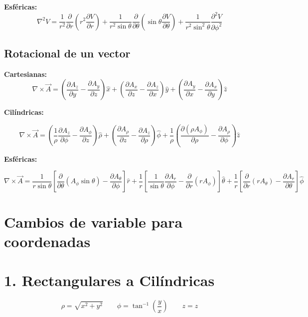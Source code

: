 \documentclass[11pt]{article}
\begin{document}
\textbf{Esféricas:}
\begin{equation}
    \nabla^2 V = \frac{1}{r^2} \frac{\partial}{\partial r} \left( r^2 \frac{\partial V}{\partial r} \right) + \frac{1}{r^2 \sin \theta} \frac{\partial}{\partial \theta} \left( \sin \theta \frac{\partial V}{\partial \theta} \right) + \frac{1}{r^2 \sin^2 \theta} \frac{\partial^2 V}{\partial \phi^2}
\end{equation}

\subsection{Rotacional de un vector}

\textbf{Cartesianas:}
\[
\nabla \times \vec{A} =
\left( \frac{\partial A_z}{\partial y} - \frac{\partial A_y}{\partial z} \right) \hat{x}
+ \left( \frac{\partial A_x}{\partial z} - \frac{\partial A_z}{\partial x} \right) \hat{y}
+ \left( \frac{\partial A_y}{\partial x} - \frac{\partial A_x}{\partial y} \right) \hat{z}
\]


\textbf{Cilíndricas:}

\[
\nabla \times \vec{A} =
\left( \frac{1}{\rho} \frac{\partial A_z}{\partial \phi} - \frac{\partial A_\phi}{\partial z} \right) \hat{\rho}
+ \left( \frac{\partial A_\rho}{\partial z} - \frac{\partial A_z}{\partial \rho} \right) \hat{\phi}
+ \frac{1}{\rho} \left( \frac{\partial (\rho A_\phi)}{\partial \rho} - \frac{\partial A_\rho}{\partial \phi} \right) \hat{z}
\]



\textbf{Esféricas:}

\[
\nabla \times \vec{A} =
\frac{1}{r \sin\theta}
\left[
\frac{\partial}{\partial \theta} (A_\phi \sin\theta) - \frac{\partial A_\theta}{\partial \phi}
\right] \hat{r}
+ \frac{1}{r}
\left[
\frac{1}{\sin\theta} \frac{\partial A_r}{\partial \phi} - \frac{\partial}{\partial r}(r A_\phi)
\right] \hat{\theta}
+ \frac{1}{r}
\left[
\frac{\partial}{\partial r}(r A_\theta) - \frac{\partial A_r}{\partial \theta}
\right] \hat{\phi}
\]




\section{Cambios de variable para coordenadas}


\section{1. Rectangulares a Cilíndricas}
\begin{equation}
\rho = \sqrt{x^2 + y^2} \qquad 
\phi = \tan^{-1}\left( \frac{y}{x} \right) \qquad 
z = z
\end{equation}
\end{document}
